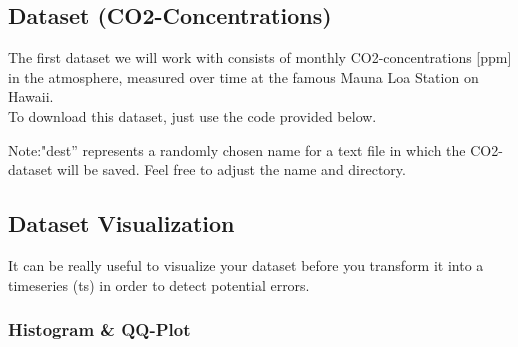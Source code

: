 \documentclass[11pt, a4paper]{article} %
\begin{document}
\subsection{Dataset (CO2-Concentrations)}%
The first dataset we will work with consists of monthly CO2-concentrations [ppm] in the atmosphere, measured over time at the famous Mauna Loa Station on Hawaii.\\
To download this dataset, just use the code provided below.
\begin{Schunk}
\end{Schunk}
\noindent Note:"dest'' represents a randomly chosen name for a text file in which the CO2-dataset will be saved. Feel free to adjust the name and directory.
\subsection{Dataset Visualization}%
It can be really useful to visualize your dataset before you transform it into a timeseries (ts) in order to detect potential errors.
\subsubsection{Histogram \& QQ-Plot}
\end{document}
